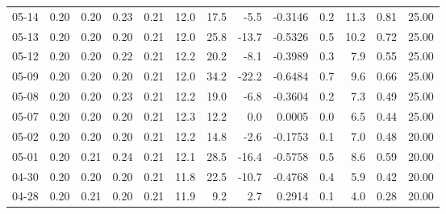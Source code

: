 \begin{threeparttable}
{\begin{tabular}{lrrrrrrrrrrrr}
  05-14 &          0.20 &          0.20 &          0.23 &        0.21 &                12.0 &                17.5 &       -5.5 &      -0.3146 &                 0.2 &             11.3 &            0.81 &                  25.00 \\
  05-13 &          0.20 &          0.20 &          0.20 &        0.21 &                12.0 &                25.8 &      -13.7 &      -0.5326 &                 0.5 &             10.2 &            0.72 &                  25.00 \\
  05-12 &          0.20 &          0.20 &          0.22 &        0.21 &                12.2 &                20.2 &       -8.1 &      -0.3989 &                 0.3 &              7.9 &            0.55 &                  25.00 \\
  05-09 &          0.20 &          0.20 &          0.20 &        0.21 &                12.0 &                34.2 &      -22.2 &      -0.6484 &                 0.7 &              9.6 &            0.66 &                  25.00 \\
  05-08 &          0.20 &          0.20 &          0.23 &        0.21 &                12.2 &                19.0 &       -6.8 &      -0.3604 &                 0.2 &              7.3 &            0.49 &                  25.00 \\
  05-07 &          0.20 &          0.20 &          0.20 &        0.21 &                12.3 &                12.2 &        0.0 &       0.0005 &                 0.0 &              6.5 &            0.44 &                  25.00 \\
  05-02 &          0.20 &          0.20 &          0.20 &        0.21 &                12.2 &                14.8 &       -2.6 &      -0.1753 &                 0.1 &              7.0 &            0.48 &                  20.00 \\
  05-01 &          0.20 &          0.21 &          0.24 &        0.21 &                12.1 &                28.5 &      -16.4 &      -0.5758 &                 0.5 &              8.6 &            0.59 &                  20.00 \\
  04-30 &          0.20 &          0.20 &          0.20 &        0.21 &                11.8 &                22.5 &      -10.7 &      -0.4768 &                 0.4 &              5.9 &            0.42 &                  20.00 \\
  04-28 &          0.20 &          0.21 &          0.20 &        0.21 &                11.9 &                 9.2 &        2.7 &       0.2914 &                 0.1 &              4.0 &            0.28 &                  20.00 \\

\end{tabular}}
\end{threeparttable}
